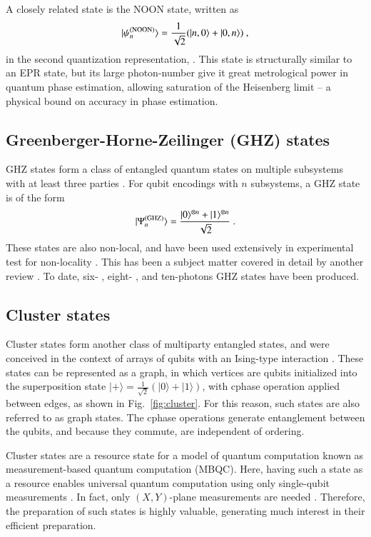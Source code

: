 \documentclass[times,final]{elsarticle}
\newcommand{\ket}[1]{|#1\rangle}
\newcommand{\sihui}[1]{{\color{red}{#1}}}
\begin{document}
A closely related state is the NOON state, written as
\begin{align}
\ket{\psi^{\rm (NOON)}_n}=\frac{1}{\sqrt{2}}(\ket{n,0}+\ket{0,n})\ ,
\end{align}
in the second quantization representation, \sihui{and the basis is the same as that for eq.~(\ref{eq:dualrail})}. This state is structurally similar to an EPR state, but its large photon-number give it great metrological power in quantum phase estimation, allowing saturation of the Heisenberg limit -- a physical bound on accuracy in phase estimation.

\subsection{Greenberger-Horne-Zeilinger (GHZ) states}

GHZ states form a class of entangled quantum states on multiple subsystems with at least three parties \cite{bib:GHZ89}. For qubit encodings with $n$ subsystems, a GHZ state is of the form
\begin{align}
\ket{\Psi_{n}^{\rm (GHZ)}}=\frac{\ket{0}^{\otimes n}+\ket{1}^{\otimes n}}{\sqrt{2}} \ .
\end{align}
These states are also non-local, and have been used extensively in experimental test for non-locality \cite{bib:JW00,bib:Zhang15}. This has been a subject matter covered in detail by another review \cite{bib:JW12}. To date, six- \cite{bib:Lu06,bib:Zhang15}, eight- \cite{bib:Huang11,bib:Yao12}, and ten-photons \cite{bib:WangChen16,bib:Chen17} GHZ states have been produced.

\subsection{Cluster states}\label{section:cluster}

Cluster states form another class of multiparty entangled states, and were conceived in the context of arrays of qubits with an Ising-type interaction \cite{bib:Briegel01}. These states can be represented as a graph, in which vertices are qubits initialized into the superposition state $\ket{+}=\frac{1}{\sqrt{2}}(\ket{0}+\ket{1})$, with {\sc cphase} operation applied between edges, as shown in Fig.~\ref{fig:cluster}. For this reason, such states are also referred to as graph states. The {\sc cphase} operations generate entanglement between the qubits, and because they commute, are independent of ordering.

Cluster states are a resource state for a model of quantum computation known as measurement-based quantum computation (MBQC). Here, having such a state as a resource enables universal quantum computation using only single-qubit measurements \cite{bib:Raussendorf03}. In fact, only $(X,Y)$-plane measurements are needed \cite{bib:Mantri17}. Therefore, the preparation of such states is highly valuable, generating much interest in their efficient preparation.
\end{document}
